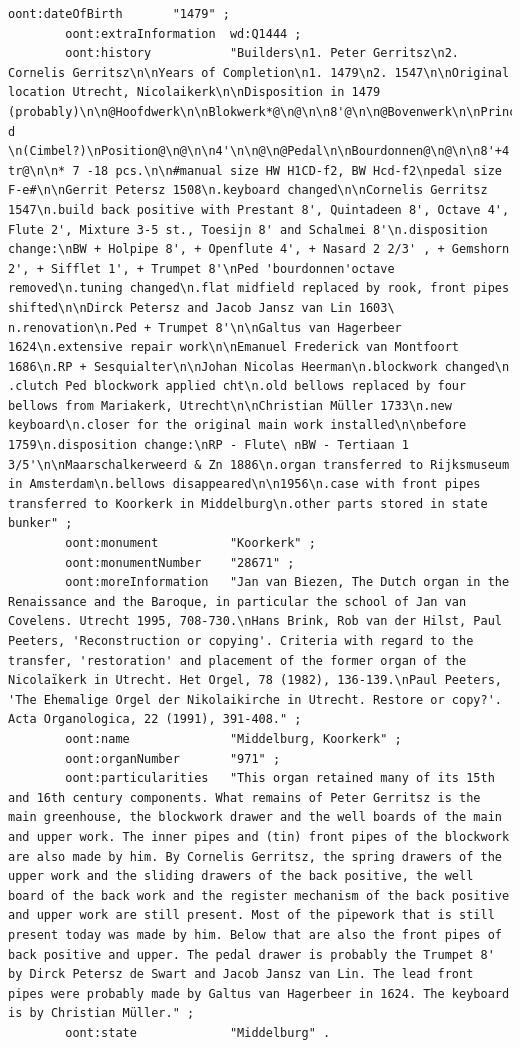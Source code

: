 \begin{lstlisting}[caption={Part01\_001MIDDE}]
        oont:dateOfBirth       "1479" ;
        oont:extraInformation  wd:Q1444 ;
        oont:history           "Builders\n1. Peter Gerritsz\n2. Cornelis Gerritsz\n\nYears of Completion\n1. 1479\n2. 1547\n\nOriginal location Utrecht, Nicolaikerk\n\nDisposition in 1479 (probably)\n\n@Hoofdwerk\n\nBlokwerk*@\n@\n\n8'@\n\n@Bovenwerk\n\nPrincipal d \n(Cimbel?)\nPosition@\n@\n\n4'\n\n@\n@Pedal\n\nBourdonnen@\n@\n\n8'+4' tr@\n\n* 7 -18 pcs.\n\n#manual size HW H1CD-f2, BW Hcd-f2\npedal size F-e#\n\nGerrit Petersz 1508\n.keyboard changed\n\nCornelis Gerritsz 1547\n.build back positive with Prestant 8', Quintadeen 8', Octave 4', Flute 2', Mixture 3-5 st., Toesijn 8' and Schalmei 8'\n.disposition change:\nBW + Holpipe 8', + Openflute 4', + Nasard 2 2/3' , + Gemshorn 2', + Sifflet 1', + Trumpet 8'\nPed 'bourdonnen'octave removed\n.tuning changed\n.flat midfield replaced by rook, front pipes shifted\n\nDirck Petersz and Jacob Jansz van Lin 1603\ n.renovation\n.Ped + Trumpet 8'\n\nGaltus van Hagerbeer 1624\n.extensive repair work\n\nEmanuel Frederick van Montfoort 1686\n.RP + Sesquialter\n\nJohan Nicolas Heerman\n.blockwork changed\n .clutch Ped blockwork applied cht\n.old bellows replaced by four bellows from Mariakerk, Utrecht\n\nChristian Müller 1733\n.new keyboard\n.closer for the original main work installed\n\nbefore 1759\n.disposition change:\nRP - Flute\ nBW - Tertiaan 1 3/5'\n\nMaarschalkerweerd & Zn 1886\n.organ transferred to Rijksmuseum in Amsterdam\n.bellows disappeared\n\n1956\n.case with front pipes transferred to Koorkerk in Middelburg\n.other parts stored in state bunker" ;
        oont:monument          "Koorkerk" ;
        oont:monumentNumber    "28671" ;
        oont:moreInformation   "Jan van Biezen, The Dutch organ in the Renaissance and the Baroque, in particular the school of Jan van Covelens. Utrecht 1995, 708-730.\nHans Brink, Rob van der Hilst, Paul Peeters, 'Reconstruction or copying'. Criteria with regard to the transfer, 'restoration' and placement of the former organ of the Nicolaïkerk in Utrecht. Het Orgel, 78 (1982), 136-139.\nPaul Peeters, 'The Ehemalige Orgel der Nikolaikirche in Utrecht. Restore or copy?'. Acta Organologica, 22 (1991), 391-408." ;
        oont:name              "Middelburg, Koorkerk" ;
        oont:organNumber       "971" ;
        oont:particularities   "This organ retained many of its 15th and 16th century components. What remains of Peter Gerritsz is the main greenhouse, the blockwork drawer and the well boards of the main and upper work. The inner pipes and (tin) front pipes of the blockwork are also made by him. By Cornelis Gerritsz, the spring drawers of the upper work and the sliding drawers of the back positive, the well board of the back work and the register mechanism of the back positive and upper work are still present. Most of the pipework that is still present today was made by him. Below that are also the front pipes of back positive and upper. The pedal drawer is probably the Trumpet 8' by Dirck Petersz de Swart and Jacob Jansz van Lin. The lead front pipes were probably made by Galtus van Hagerbeer in 1624. The keyboard is by Christian Müller." ;
        oont:state             "Middelburg" .


\end{lstlisting}
